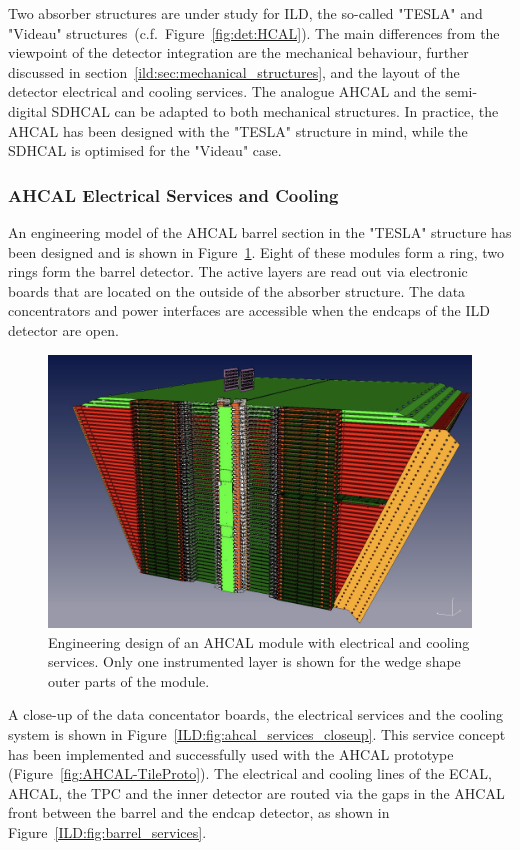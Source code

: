 Two absorber structures are under study for ILD, the so-called "TESLA" and "Videau" structures~(c.f.~Figure~\ref{fig:det:HCAL}). The main differences from the viewpoint of the detector integration are the mechanical behaviour, further discussed in section~\ref{ild:sec:mechanical_structures}, and the layout of the detector electrical and cooling services. The analogue AHCAL and the semi-digital SDHCAL can be adapted to both mechanical structures. In practice, the AHCAL has been designed with the "TESLA" structure in mind, while the SDHCAL is optimised for the "Videau" case.

\subsubsection{AHCAL Electrical Services and Cooling}
An engineering model of the AHCAL barrel section in the "TESLA" structure has been designed and is shown in Figure~\ref{ILD:fig:ahcal_module_services}. Eight of these modules form a ring, two rings form the barrel detector. The active layers are read out via electronic boards that are located on the outside of the absorber structure. The data concentrators and power interfaces are accessible when the endcaps of the ILD detector are open.  
\begin{figure}[h!]
    \centering
        \includegraphics[width=0.8\hsize]{Integration/fig/AHCAL_Module_Services.png}
    \caption{Engineering design of an AHCAL module with electrical and cooling services. Only one instrumented layer is shown for the wedge shape outer parts of the module.}
    \label{ILD:fig:ahcal_module_services}
\end{figure}
A close-up of the data concentator boards, the electrical services and the cooling system is shown in Figure~\ref{ILD:fig:ahcal_services_closeup}. This service concept has been implemented and successfully used with the AHCAL prototype (Figure~\ref{fig:AHCAL-TileProto}). The electrical and cooling lines of the ECAL, AHCAL, the TPC and the inner detector are routed via the gaps in the AHCAL front between the barrel and the endcap detector, as shown in Figure~\ref{ILD:fig:barrel_services}. 
